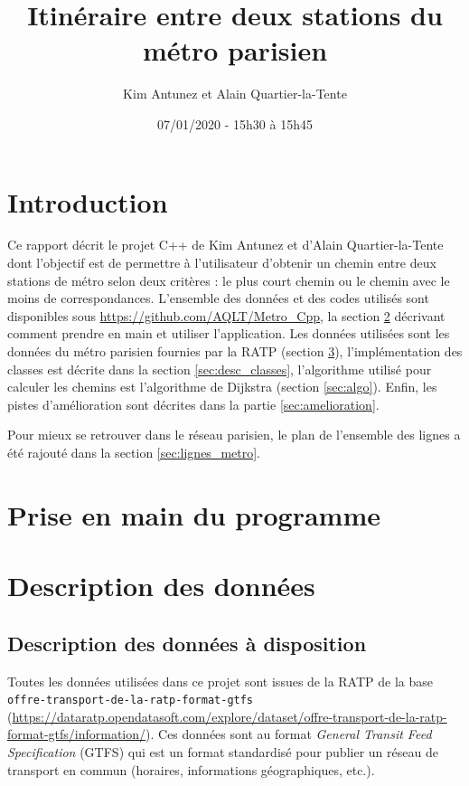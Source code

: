 \documentclass[,french]{article}
\title{Itinéraire entre deux stations du métro parisien}
\author{Kim Antunez et Alain Quartier-la-Tente}
\date{07/01/2020 - 15h30 à 15h45}
\begin{document}
\maketitle

{
\hypersetup{linkcolor=}
\setcounter{tocdepth}{2}
\tableofcontents
}
\hypertarget{introduction}{%
\section{Introduction}\label{introduction}}

Ce rapport décrit le projet C++ de Kim Antunez et d'Alain
Quartier-la-Tente dont l'objectif est de permettre à l'utilisateur
d'obtenir un chemin entre deux stations de métro selon deux critères :
le plus court chemin ou le chemin avec le moins de correspondances.
L'ensemble des données et des codes utilisés sont disponibles sous
\url{https://github.com/AQLT/Metro_Cpp}, la section
\ref{sec:pris_en_main} décrivant comment prendre en main et utiliser
l'application. Les données utilisées sont les données du métro parisien
fournies par la RATP (section \ref{sec:def_donnees}), l'implémentation
des classes est décrite dans la section \ref{sec:desc_classes},
l'algorithme utilisé pour calculer les chemins est l'algorithme de
Dijkstra (section \ref{sec:algo}). Enfin, les pistes d'amélioration sont
décrites dans la partie \ref{sec:amelioration}.

Pour mieux se retrouver dans le réseau parisien, le plan de l'ensemble
des lignes a été rajouté dans la section \ref{sec:lignes_metro}.

\hypertarget{sec:pris_en_main}{%
\section{Prise en main du programme}\label{sec:pris_en_main}}

\hypertarget{sec:def_donnees}{%
\section{Description des données}\label{sec:def_donnees}}

\hypertarget{description-des-donnuxe9es-uxe0-disposition}{%
\subsection{Description des données à
disposition}\label{description-des-donnuxe9es-uxe0-disposition}}

Toutes les données utilisées dans ce projet sont issues de la RATP de la
base \texttt{offre-transport-de-la-ratp-format-gtfs}
(\url{https://dataratp.opendatasoft.com/explore/dataset/offre-transport-de-la-ratp-format-gtfs/information/}).
Ces données sont au format \emph{General Transit Feed Specification}
(GTFS) qui est un format standardisé pour publier un réseau de transport
en commun (horaires, informations géographiques, etc.).
\end{document}
